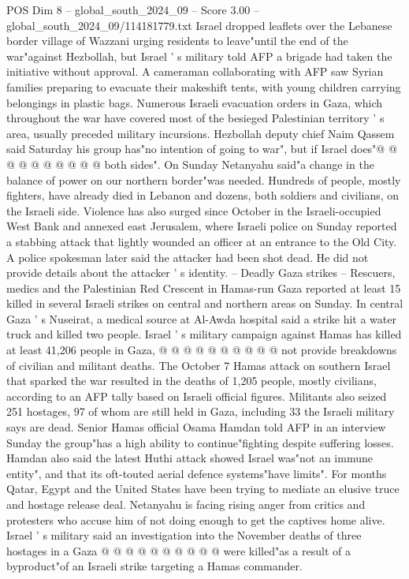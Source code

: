 \begin{textsample}{POS Dim 8 – global\_south\_2024\_09 – Score 3.00 – global\_south\_2024\_09/114181779.txt}
Israel dropped leaflets over the Lebanese border village of Wazzani urging residents to leave"until the end of the war"against Hezbollah, but Israel ' s military told AFP a brigade had taken the initiative without approval.
A cameraman collaborating with AFP saw Syrian families preparing to evacuate their makeshift tents, with young children carrying belongings in plastic bags.
Numerous Israeli evacuation orders in Gaza, which throughout the war have covered most of the besieged Palestinian territory ' s area, usually preceded military incursions.
Hezbollah deputy chief Naim Qassem said Saturday his group has"no intention of going to war", but if Israel does"@ @ @ @ @ @ @ @ @ @ both sides".
On Sunday Netanyahu said"a change in the balance of power on our northern border"was needed.
Hundreds of people, mostly fighters, have already died in Lebanon and dozens, both soldiers and civilians, on the Israeli side.
Violence has also surged since October in the Israeli-occupied West Bank and annexed east Jerusalem, where Israeli police on Sunday reported a stabbing attack that lightly wounded an officer at an entrance to the Old City.
A police spokesman later said the attacker had been shot dead.
He did not provide details about the attacker ' s identity. -- Deadly Gaza strikes -- Rescuers, medics and the Palestinian Red Crescent in Hamas-run Gaza reported at least 15 killed in several Israeli strikes on central and northern areas on Sunday.
In central Gaza ' s Nuseirat, a medical source at Al-Awda hospital said a strike hit a water truck and killed two people.
Israel ' s military campaign against Hamas has killed at least 41,206 people in Gaza, @ @ @ @ @ @ @ @ @ @ not provide breakdowns of civilian and militant deaths.
The October 7 Hamas attack on southern Israel that sparked the war resulted in the deaths of 1,205 people, mostly civilians, according to an AFP tally based on Israeli official figures.
Militants also seized 251 hostages, 97 of whom are still held in Gaza, including 33 the Israeli military says are dead.
Senior Hamas official Osama Hamdan told AFP in an interview Sunday the group"has a high ability to continue"fighting despite suffering losses.
Hamdan also said the latest Huthi attack showed Israel was"not an immune entity", and that its oft-touted aerial defence systems"have limits".
For months Qatar, Egypt and the United States have been trying to mediate an elusive truce and hostage release deal.
Netanyahu is facing rising anger from critics and protesters who accuse him of not doing enough to get the captives home alive.
Israel ' s military said an investigation into the November deaths of three hostages in a Gaza @ @ @ @ @ @ @ @ @ @ were killed"as a result of a byproduct"of an Israeli strike targeting a Hamas commander.

\end{textsample}
